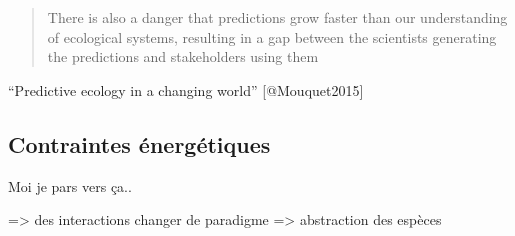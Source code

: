 \begin{quote}
There is also a danger that predictions grow faster than our
understanding of ecological systems, resulting in a gap between the
scientists generating the predictions and stakeholders using them
\end{quote}

``Predictive ecology in a changing world'' {[}@Mouquet2015{]}

\subsection{Contraintes
énergétiques}\label{contraintes-uxe9nerguxe9tiques}

Moi je pars vers ça..

=\textgreater{} des interactions changer de paradigme =\textgreater{}
abstraction des espèces

